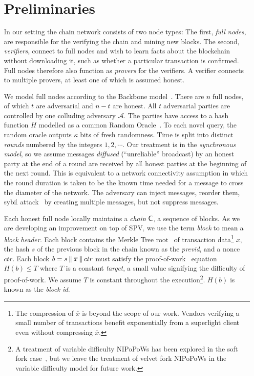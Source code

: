 \section{Preliminaries}\label{sec:preliminaries}

In our setting the chain network consists of two
node types: The first, \emph{full nodes}, are responsible for the
verifying the chain and mining new blocks. The
second, \emph{verifiers}, connect to full nodes and wish to learn facts
about the blockchain without downloading it, such as whether a particular
transaction is confirmed. Full nodes therefore also function as
\emph{provers} for the verifiers. A verifier connects to multiple provers, at
least one of which is assumed honest.

We model full nodes according to the Backbone model~\cite{backbone}. There are
$n$ full nodes, of which $t$ are adversarial and $n - t$ are honest. All $t$
adversarial parties are controlled by one colluding adversary $\mathcal{A}$. The
parties have access to a hash function $H$ modelled as a common Random
Oracle~\cite{ro}. To each novel query, the random oracle outputs $\kappa$ bits
of fresh randomness. Time is split into distinct \emph{rounds} numbered by the
integers $1, 2, \cdots$. Our treatment is in the \emph{synchronous model}, so we
assume messages \emph{diffused} (``unreliable'' broadcast) 
by an honest party at the end of a
round are received by all honest parties at the beginning of the next round.
This is equivalent to a network connectivity assumption in which the round
duration is taken to be the known time needed for a message to cross the
diameter of the network. The adversary can inject messages, reorder them, sybil
attack~\cite{sybil} by creating multiple messages, but not suppress messages.

Each honest full node locally maintains a \emph{chain} $\mathsf{C}$, a sequence of
blocks. As we are developing an improvement on top of SPV, we
use the term \emph{block} to mean a
\emph{block header}. Each block contains the Merkle Tree root~\cite{merkle} of
transaction data\footnote{The compression of
$\overline{x}$ is beyond the scope of our work. Vendors verifying a small number
of transactions benefit exponentially from a superlight client even without
compressing $\overline{x}$.}
$\overline{x}$, the hash $s$ of the previous block in the chain
known as the \emph{previd}, and a nonce $ctr$. Each block $b = s \mathbin{\|}
\overline{x} \mathbin{\|} ctr$ must satisfy the proof-of-work~\cite{pow} equation $H(b) \leq T$
where $T$ is a constant \emph{target}, a small value signifying the difficulty
of proof-of-work. We assume $T$ is constant throughout the execution\footnote{A
treatment of variable difficulty NIPoPoWs has been explored in the soft fork
case~\cite{dionyziz}, but we leave the treatment of velvet fork NIPoPoWs in the
variable difficulty model for future work.}. $H(b)$ is
known as the \emph{block id}.

